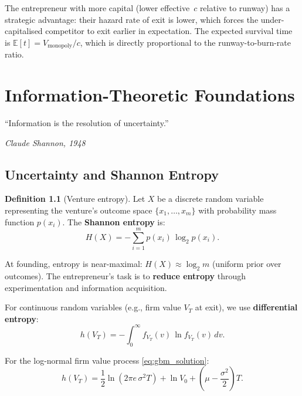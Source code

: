 \documentclass[12pt,a4paper,oneside]{book}
\theoremstyle{definition}
\newtheorem{definition}[theorem]{Definition}
\theoremstyle{remark}
\newcommand{\E}{\mathbb{E}}
\begin{document}
The entrepreneur with more capital (lower effective~$c$ relative to runway) has a
strategic advantage: their hazard rate of exit is lower, which forces the
under-capitalised competitor to exit earlier in expectation. The expected survival
time is $\E[t] = V_{\text{monopoly}} / c$, which is directly proportional to the
runway-to-burn-rate ratio.

\chapter{Information-Theoretic Foundations}\label{ch:info}

\epigraph{``Information is the resolution of uncertainty.''}
{\textit{Claude Shannon, 1948}}

\section{Uncertainty and Shannon Entropy}

\begin{definition}[Venture entropy]\label{def:entropy}
Let $X$ be a discrete random variable representing the venture's outcome
space $\{x_1, \ldots, x_m\}$ with probability mass function $p(x_i)$. The
\textbf{Shannon entropy} is:
\begin{equation}\label{eq:entropy}
  H(X) = -\sum_{i=1}^m p(x_i)\,\log_2 p(x_i).
\end{equation}
\end{definition}

At founding, entropy is near-maximal:
$H(X) \approx \log_2 m$ (uniform prior over outcomes). The entrepreneur's
task is to \textbf{reduce entropy} through experimentation and information
acquisition.

For continuous random variables (e.g., firm value $V_T$ at exit), we use
\textbf{differential entropy}:
\begin{equation}\label{eq:diff_entropy}
  h(V_T) = -\int_0^\infty f_{V_T}(v)\,\ln f_{V_T}(v)\,dv.
\end{equation}

For the log-normal firm value process \eqref{eq:gbm_solution}:
\begin{equation}\label{eq:lognormal_entropy}
  h(V_T) = \frac{1}{2}\ln(2\pi e\,\sigma^2 T) + \ln V_0
    + \left(\mu - \frac{\sigma^2}{2}\right)T.
\end{equation}
\end{document}
